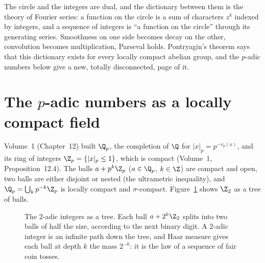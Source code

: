 \begin{beauty}
The circle and the integers are dual, and the dictionary between them is the theory of Fourier series: a function on the circle is a sum of characters $z^k$
indexed by integers, and a sequence of integers is ``a function on the circle'' through its generating series. Smoothness on one side becomes decay on the other,
convolution becomes multiplication, Parseval holds. Pontryagin's theorem says that this dictionary exists for every locally compact abelian group, and the
$p$-adic numbers below give a new, totally disconnected, page of it.
\end{beauty}

\section{The \texorpdfstring{$p$}{p}-adic numbers as a locally compact field}\label{sec:padic}

Volume~1 (Chapter~12) built $\Q_p$, the completion of $\Q$ for $|x|_p=p^{-v_p(x)}$, and its ring of integers $\Z_p=\{|x|_p\le1\}$, which is compact (Volume~1,
Proposition~12.4). The balls $a+p^k\Z_p$ ($a\in\Q_p$, $k\in\Z$) are compact and open, two balls are either disjoint or nested (the ultrametric inequality), and
$\Q_p=\bigcup_kp^{-k}\Z_p$ is locally compact and $\sigma$-compact. Figure~\ref{fig:zp} shows $\Z_2$ as a tree of balls.

\begin{figure}[ht]
\centering
{}
\caption{The $2$-adic integers as a tree. Each ball $a+2^k\Z_2$ splits into two balls of half the size, according to the next binary digit. A $2$-adic integer
is an infinite path down the tree, and Haar measure gives each ball at depth $k$ the mass $2^{-k}$: it is the law of a sequence of fair coin tosses.}
\label{fig:zp}
\end{figure}

